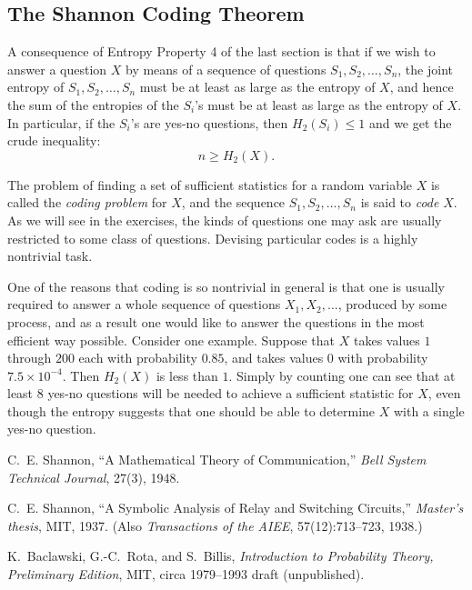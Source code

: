 \documentclass{report}
\begin{document}
\subsection*{The Shannon Coding Theorem}

A consequence of Entropy Property 4 of the last section is that if we wish to answer a question \( X \) by means of a sequence of questions \( S_1, S_2, \ldots, S_n \), the joint entropy of \( S_1, S_2, \ldots, S_n \) must be at least as large as the entropy of \( X \), and hence the sum of the entropies of the \( S_i \)'s must be at least as large as the entropy of \( X \). In particular, if the \( S_i \)'s are yes-no questions, then \( H_2(S_i) \leq 1 \) and we get the crude inequality:
\[
n \geq H_2(X).
\]

The problem of finding a set of sufficient statistics for a random variable \( X \) is called the \emph{coding problem} for \( X \), and the sequence \( S_1, S_2, \ldots, S_n \) is said to \emph{code} \( X \). As we will see in the exercises, the kinds of questions one may ask are usually restricted to some class of questions. Devising particular codes is a highly nontrivial task.

One of the reasons that coding is so nontrivial in general is that one is usually required to answer a whole sequence of questions \( X_1, X_2, \ldots \), produced by some process, and as a result one would like to answer the questions in the most efficient way possible. Consider one example. Suppose that \( X \) takes values \( 1 \) through \( 200 \) each with probability \( 0.85 \), and takes values \( 0 \) with probability \( 7.5 \times 10^{-4} \). Then \( H_2(X) \) is less than \( 1 \). Simply by counting one can see that at least \( 8 \) yes-no questions will be needed to achieve a sufficient statistic for \( X \), even though the entropy suggests that one should be able to determine \( X \) with a single yes-no question.

\vspace{1em}
\begin{thebibliography}{9}
C.~E. Shannon,
\newblock ``A Mathematical Theory of Communication,''
\newblock \emph{Bell System Technical Journal}, 27(3), 1948.

C.~E. Shannon,
\newblock ``A Symbolic Analysis of Relay and Switching Circuits,''
\newblock \emph{Master's thesis}, MIT, 1937. (Also \emph{Transactions of the AIEE}, 57(12):713--723, 1938.)

K.~Baclawski, G.-C.~Rota, and S.~Billis,
\newblock \emph{Introduction to Probability Theory, Preliminary Edition},
\newblock MIT, circa 1979--1993 draft (unpublished).

\end{thebibliography}
\end{document}
